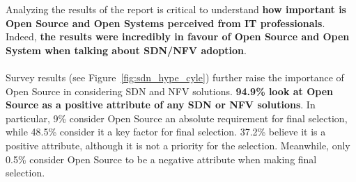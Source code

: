 \documentclass[a4paper, 12pt]{book}
\begin{document}
Analyzing the results of the report is critical to understand \textbf{how important is Open Source and Open Systems perceived from IT professionals}. Indeed, \textbf{the results were incredibly in favour of Open Source and Open System when talking about SDN/NFV adoption}.\\
\\
Survey results (see Figure~\ref{fig:sdn_hype_cyle}) further raise the importance of Open Source in considering SDN and NFV solutions. \textbf{94.9\% look at Open Source as a positive attribute of any SDN or NFV solutions}. In particular, 9\% consider Open Source an absolute requirement for final selection, while 48.5\% consider it a key factor for final selection. 37.2\% believe it is a positive attribute, although it is not a priority for the selection. Meanwhile, only 0.5\% consider Open Source to be a negative attribute when making final selection.
\end{document}
